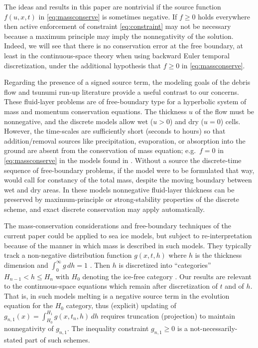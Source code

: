\documentclass[final,onefignum]{siamart190516}
\begin{document}
The ideas and results in this paper are nontrivial if the source function $f(u,x,t)$ in \eqref{eq:massconserve} is sometimes negative.  If $f\ge 0$ holds everywhere then active enforcement of constraint \eqref{eq:constraint} may not be necessary because a maximum principle may imply the nonnegativity of the solution.  Indeed, we will see that there is no conservation error at the free boundary, at least in the continuous-space theory when using backward Euler temporal discretization, under the additional hypothesis that $f\ge 0$ in \eqref{eq:massconserve}.

Regarding the presence of a signed source term, the modeling goals of the debris flow \cite{GeorgeIverson2014} and tsunumi run-up \cite{LeVequeetal2011} literature provide a useful contrast to our concerns.  These fluid-layer problems are of free-boundary type for a hyperbolic system of mass and momentum conservation equations.  The thickness $u$ of the flow must be nonnegative, and the discrete models allow wet ($u>0$) and dry ($u=0$) cells.  However, the time-scales are sufficiently short (seconds to hours) so that addition/removal sources like precipitation, evaporation, or absorption into the ground are absent from the conservation of mass equation; e.g.~$f=0$ in \eqref{eq:massconserve} in the models found in \cite{GeorgeIverson2014,LeVequeetal2011}.  Without a source the discrete-time sequence of free-boundary problems, if the model were to be formulated that way, would call for constancy of the total mass, despite the moving boundary between wet and dry areas.  In these models nonnegative fluid-layer thickness can be preserved by maximum-principle or strong-stability properties of the discrete scheme, and exact discrete conservation may apply automatically.

The mass-conservation considerations and free-boundary techniques of the current paper could be applied to sea ice models, but subject to re-interpretation because of the manner in which mass is described in such models.  They typically track a non-negative distribution function $g(x,t,h)$ where $h$ is the thickness dimension and $\int_0^\infty g\,dh = 1$ \cite[for example]{Thorndikeetal1975}.  Then $h$ is discretized into ``categories'' $H_{n-1} < h \le H_n$ with $H_0$ denoting the ice-free category \cite{LipscombHunke2004}.  Our results are relevant to the continuous-space equations which remain after discretization of $t$ and of $h$.  That is, in such models melting is a negative source term in the evolution equation for the $H_0$ category, thus (explicit) updating of $g_{n,1}(x) = \int_{H_0}^{H_1} g(x,t_n,h)\,dh$ requires truncation (projection) to maintain nonnegativity of $g_{n,1}$.  The inequality constraint $g_{n,1} \ge 0$ is a not-necessarily-stated part of such schemes.
\end{document}
